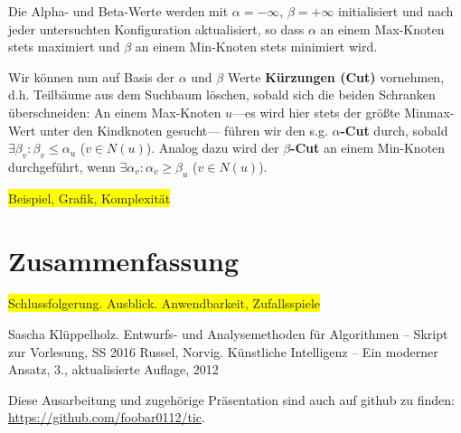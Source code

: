 \documentclass[a4paper,twoside]{scrartcl}
\newcommand\todo[1]{\colorbox{yellow}{#1}}
\begin{document}
Die Alpha- und Beta-Werte werden mit $\alpha = -\infty$, $\beta = +\infty$ initialisiert und nach jeder untersuchten Konfiguration aktualisiert, so dass $\alpha$ an einem Max-Knoten stets maximiert und $\beta$ an einem Min-Knoten stets minimiert wird.

Wir können nun auf Basis der $\alpha$ und $\beta$ Werte \textbf{Kürzungen (Cut)} vornehmen, d.h. Teilbäume aus dem Suchbaum löschen, sobald sich die beiden Schranken überschneiden: An einem Max-Knoten $u$---es wird hier stets der größte Minmax-Wert unter den Kindknoten gesucht--- führen wir den s.g. \textbf{$\alpha$-Cut} durch, sobald $\exists \beta_v : \beta_v \leq \alpha_u$ ($v \in N(u)$). Analog dazu wird der \textbf{$\beta$-Cut} an einem Min-Knoten durchgeführt, wenn $\exists \alpha_v : \alpha_v \geq \beta_u$ ($v \in N(u)$).


\todo{Beispiel, Grafik, Komplexität}


\section{Zusammenfassung}

\todo{Schlussfolgerung. Ausblick. Anwendbarkeit, Zufallsspiele}


\begin{thebibliography}{99}
   Sascha Klüppelholz.
  \newblock Entwurfs- und Analysemethoden für Algorithmen -- Skript zur Vorlesung, SS 2016
   Russel, Norvig.
  \newblock Künstliche Intelligenz -- Ein moderner Ansatz, 3., aktualisierte Auflage, 2012 
\end{thebibliography}


\vspace{4\baselineskip}
Diese Ausarbeitung und zugehörige Präsentation sind auch auf github zu finden: \\\url{https://github.com/foobar0112/tic}.
\end{document}
